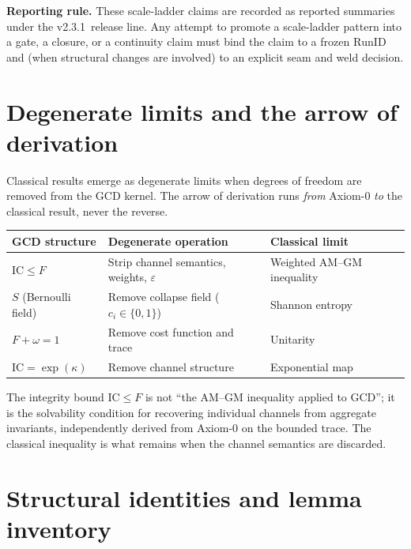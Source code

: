 \documentclass[
  aps,
  prd,
  preprint,
  superscriptaddress,
  nofootinbib,
  floatfix
]{revtex4-2}
\newcommand{\IC}{\mathrm{IC}}
\newcommand{\ValidatorLine}{v2.3.1}
\begin{document}
\noindent\textbf{Reporting rule.}
These scale-ladder claims are recorded as reported summaries under the \ValidatorLine\ release line.
Any attempt to promote a scale-ladder pattern into a gate, a closure, or a continuity claim must bind the claim to a frozen
$\mathrm{RunID}$ and (when structural changes are involved) to an explicit seam and weld decision.

\section{Degenerate limits and the arrow of derivation}
\label{sec:degenerate}

Classical results emerge as degenerate limits when degrees of freedom are removed from the GCD kernel.
The arrow of derivation runs \emph{from} Axiom-0 \emph{to} the classical result, never the reverse.

\begin{center}
\begin{tabular}{@{}lll@{}}
\toprule
GCD structure & Degenerate operation & Classical limit \\
\midrule
$\IC \le F$ & Strip channel semantics, weights, $\varepsilon$ & Weighted AM--GM inequality \\
$S$ (Bernoulli field) & Remove collapse field ($c_i\in\{0,1\}$) & Shannon entropy \\
$F+\omega=1$ & Remove cost function and trace & Unitarity \\
$\IC=\exp(\kappa)$ & Remove channel structure & Exponential map \\
\bottomrule
\end{tabular}
\end{center}

\noindent The integrity bound $\IC\le F$ is not ``the AM--GM inequality applied to GCD'';
it is the solvability condition for recovering individual channels from aggregate invariants,
independently derived from Axiom-0 on the bounded trace.
The classical inequality is what remains when the channel semantics are discarded.

\section{Structural identities and lemma inventory}
\label{sec:identities}
\end{document}
